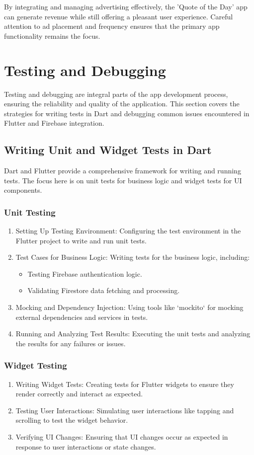 \documentclass{book}
\begin{document}
By integrating and managing advertising effectively, the 'Quote of the Day' app can generate revenue while still offering a pleasant user experience. Careful attention to ad placement and frequency ensures that the primary app functionality remains the focus.

\section{Testing and Debugging}
Testing and debugging are integral parts of the app development process, ensuring the reliability and quality of the application. This section covers the strategies for writing tests in Dart and debugging common issues encountered in Flutter and Firebase integration.

\subsection{Writing Unit and Widget Tests in Dart}
Dart and Flutter provide a comprehensive framework for writing and running tests. The focus here is on unit tests for business logic and widget tests for UI components.

\subsubsection{Unit Testing}
\begin{enumerate}
    \item Setting Up Testing Environment: Configuring the test environment in the Flutter project to write and run unit tests.
    \item Test Cases for Business Logic: Writing tests for the business logic, including:
    \begin{itemize}
        \item Testing Firebase authentication logic.
        \item Validating Firestore data fetching and processing.
    \end{itemize}
    \item Mocking and Dependency Injection: Using tools like `mockito` for mocking external dependencies and services in tests.
    \item Running and Analyzing Test Results: Executing the unit tests and analyzing the results for any failures or issues.
\end{enumerate}

\subsubsection{Widget Testing}
\begin{enumerate}
    \item Writing Widget Tests: Creating tests for Flutter widgets to ensure they render correctly and interact as expected.
    \item Testing User Interactions: Simulating user interactions like tapping and scrolling to test the widget behavior.
    \item Verifying UI Changes: Ensuring that UI changes occur as expected in response to user interactions or state changes.
\end{enumerate}
\end{document}
